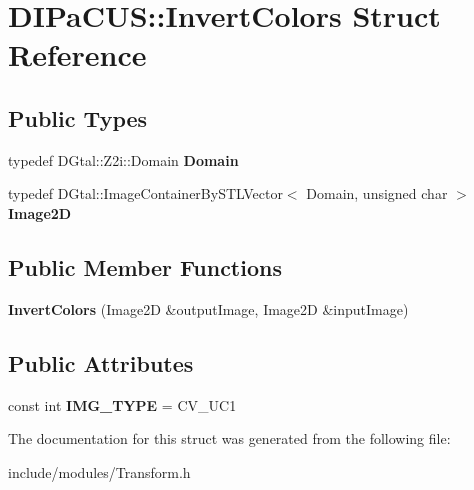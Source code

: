 \hypertarget{structDIPaCUS_1_1InvertColors}{}\section{D\+I\+Pa\+C\+US\+:\+:Invert\+Colors Struct Reference}
\label{structDIPaCUS_1_1InvertColors}
\subsection*{Public Types}
\begin{DoxyCompactItemize}
\item 
\mbox{\label{structDIPaCUS_1_1InvertColors_a815b137dde1b6e8ca902489ec33c7f30}} 
typedef D\+Gtal\+::\+Z2i\+::\+Domain {\bfseries Domain}
\item 
\mbox{\label{structDIPaCUS_1_1InvertColors_a2b081368748488b8dcd0237b8ac1870f}} 
typedef D\+Gtal\+::\+Image\+Container\+By\+S\+T\+L\+Vector$<$ Domain, unsigned char $>$ {\bfseries Image2D}
\end{DoxyCompactItemize}
\subsection*{Public Member Functions}
\begin{DoxyCompactItemize}
\item 
\mbox{\label{structDIPaCUS_1_1InvertColors_a8ba17cff9afcee1def631301c10e8015}} 
{\bfseries Invert\+Colors} (Image2D \&output\+Image, Image2D \&input\+Image)
\end{DoxyCompactItemize}
\subsection*{Public Attributes}
\begin{DoxyCompactItemize}
\item 
\mbox{\label{structDIPaCUS_1_1InvertColors_a4cf7620eec4f2cdb6b2db8e63d038334}} 
const int {\bfseries I\+M\+G\+\_\+\+T\+Y\+PE} = C\+V\+\_\+U\+C1
\end{DoxyCompactItemize}


The documentation for this struct was generated from the following file\+:\begin{DoxyCompactItemize}
\item 
include/modules/Transform.\+h\end{DoxyCompactItemize}
